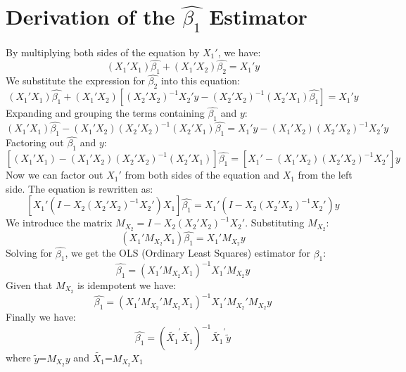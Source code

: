 \documentclass{article}
\begin{document}
\section{Derivation of the $\hat{\beta_1}$ Estimator}
By multiplying both sides of the equation by $X_1'$, we have:
\begin{equation}
(X_1'X_1)\hat{\beta_1} + (X_1'X_2)\hat{\beta_2} = X_1'y
\end{equation}
We substitute the expression for $\hat{\beta_2}$ into this equation:
\begin{equation}
(X_1'X_1)\hat{\beta_1} + (X_1'X_2)\left[(X_2'X_2)^{-1}X_2'y - (X_2'X_2)^{-1}(X_2'X_1)\hat{\beta_1}\right] = X_1'y
\end{equation}
Expanding and grouping the terms containing $\hat{\beta_1}$ and $y$:
\begin{equation}
(X_1'X_1)\hat{\beta_1} - (X_1'X_2)(X_2'X_2)^{-1}(X_2'X_1)\hat{\beta_1} = X_1'y - (X_1'X_2)(X_2'X_2)^{-1}X_2'y
\end{equation}
Factoring out $\hat{\beta_1}$ and $y$:
\begin{equation}
\left[(X_1'X_1) - (X_1'X_2)(X_2'X_2)^{-1}(X_2'X_1)\right]\hat{\beta_1} = \left[X_1' - (X_1'X_2)(X_2'X_2)^{-1}X_2'\right]y
\end{equation}
Now we can factor out $X_1'$ from both sides of the equation and $X_1$ from the left side. The equation is rewritten as:
\begin{equation}
\left[X_1'(I - X_2(X_2'X_2)^{-1}X_2')X_1\right]\hat{\beta_1} = X_1'(I - X_2(X_2'X_2)^{-1}X_2')y
\end{equation}
We introduce the matrix $M_{X_2} =I - X_2(X_2'X_2)^{-1}X_2'$. Substituting $M_{X_2}$:
\begin{equation}
(X_1'M_{X_2}X_1)\hat{\beta_1} = X_1'M_{X_2}y
\end{equation}
Solving for $\hat{\beta_1}$, we get the OLS (Ordinary Least Squares) estimator for $\beta_1$:
\begin{equation}
\hat{\beta_1} = (X_1'M_{X_2}X_1)^{-1}X_1'M_{X_2}y
\end{equation}
Given that $M_{X_2}$ is idempotent we have:
\begin{equation}
\hat{\beta_1} = (X_1'M_{X_2}'M_{X_2}X_1)^{-1}X_1'M_{X_2}'M_{X_2}y
\end{equation}
Finally we have:
\begin{equation}
\hat{\beta_1} = (\tilde{X_1}^{'}\tilde{X_1})^{-1}\tilde{X_1}^{'}\tilde{y}
\end{equation}
where $\tilde{y}$=$M_{X_2}y$ and $\tilde{X_1}$=$M_{X_2}X_1$
\end{document}
